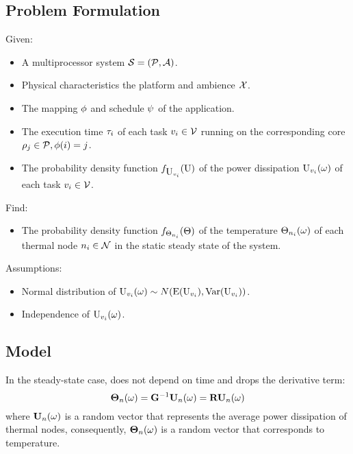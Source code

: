 \subsection{Problem Formulation}
Given:
\begin{itemize}
  \item A multiprocessor system $\mathcal{S} = (\mathcal{P}, \mathcal{A})$.
  \item Physical characteristics the platform and ambience $\mathcal{X}$.
  \item The mapping $\phi$ and schedule $\psi$ of the application.
  \item The execution time $\tau_i$ of each task $v_i \in \mathcal{V}$ running on the corresponding core $\rho_j \in \mathcal{P}, \phi(i) = j$.
  \item The probability density function $f_{\mbox{U}_{v_i}}(\mbox{U})$ of the power dissipation $\mbox{U}_{v_i}(\omega)$ of each task $v_i \in \mathcal{V}$.
\end{itemize}

Find:
\begin{itemize}
  \item The probability density function $f_{\Theta_{n_i}}(\Theta)$ of the temperature $\Theta_{n_i}(\omega)$ of each thermal node $n_i \in \mathcal{N}$ in the static steady state of the system.
\end{itemize}

Assumptions:
\begin{itemize}
  \item Normal distribution of $\mbox{U}_{v_i}(\omega) \sim N(\text{E}(\mbox{U}_{v_i}), \text{Var}(\mbox{U}_{v_i}))$.
  \item Independence of $\mbox{U}_{v_i}(\omega)$.
\end{itemize}

\subsection{Model}
In the steady-state case,  does not depend on time and drops the derivative term:
\[
  \mathbf{\Theta}_n(\omega) = \mathbf{G}^{-1} \mathbf{U}_n(\omega) = \mathbf{R} \mathbf{U}_n(\omega)
\]
where $\mathbf{U}_n(\omega)$ is a random vector that represents the average power dissipation of thermal nodes, consequently, $\mathbf{\Theta}_n(\omega)$ is a random vector that corresponds to temperature.

